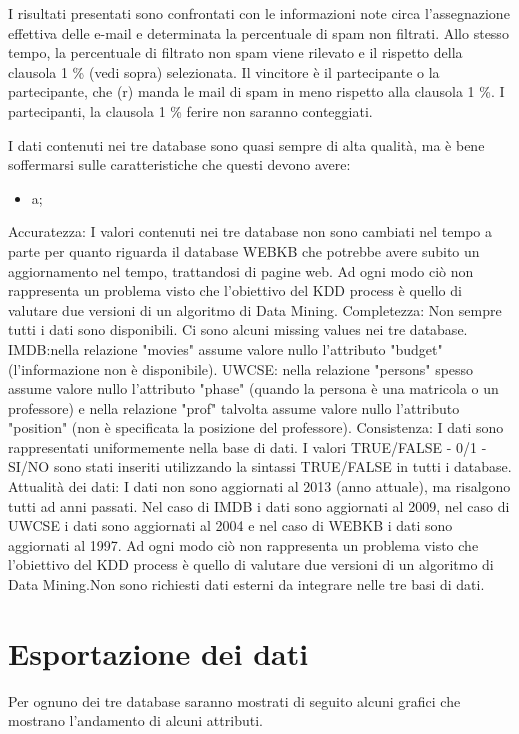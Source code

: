 I risultati presentati sono confrontati con le informazioni note circa l'assegnazione effettiva delle e-mail e determinata la percentuale di spam non filtrati. Allo stesso tempo, la percentuale di filtrato non spam viene rilevato e il rispetto della clausola 1 \% (vedi sopra) selezionata. Il vincitore è il partecipante o la partecipante, che (r) manda le mail di spam in meno rispetto alla clausola 1 \%. I partecipanti, la clausola 1 \% ferire non saranno conteggiati.


I dati contenuti nei tre database sono quasi sempre di alta qualità, ma è bene soffermarsi sulle caratteristiche che questi devono avere:
\begin{itemize}
	\item a;
\end{itemize}

Accuratezza: I valori contenuti nei tre database non sono cambiati nel tempo a parte per quanto riguarda il database WEBKB che potrebbe avere subito un aggiornamento nel tempo, trattandosi di pagine web. Ad ogni modo ciò non rappresenta un problema visto che l'obiettivo del KDD process è quello di valutare due versioni di un algoritmo di Data Mining.
Completezza: Non sempre tutti i dati sono disponibili. Ci sono alcuni missing values nei tre database.
IMDB:nella relazione "movies" assume valore nullo l'attributo "budget" (l'informazione non è disponibile).
UWCSE: nella relazione "persons" spesso assume valore nullo l'attributo "phase" (quando la persona è una matricola o un professore) e nella relazione "prof" talvolta assume valore nullo l'attributo "position" (non è specificata la posizione del professore). 
Consistenza: I dati sono rappresentati uniformemente nella base di dati. I valori TRUE/FALSE - 0/1 - SI/NO sono stati inseriti utilizzando la sintassi TRUE/FALSE in tutti i database. 
Attualità dei dati: I dati non sono aggiornati al 2013 (anno attuale), ma risalgono tutti ad anni passati. 
Nel caso di IMDB i dati sono aggiornati al 2009, nel caso di UWCSE i dati sono aggiornati al 2004 e nel caso di WEBKB i dati sono aggiornati al 1997. Ad ogni modo ciò non rappresenta un problema visto che l’obiettivo del KDD process è quello di valutare due versioni di un algoritmo di Data Mining.Non sono richiesti dati esterni da integrare nelle tre basi di dati.

\section{Esportazione dei dati}
Per ognuno dei tre database saranno mostrati di seguito alcuni grafici che mostrano l’andamento di alcuni attributi.


